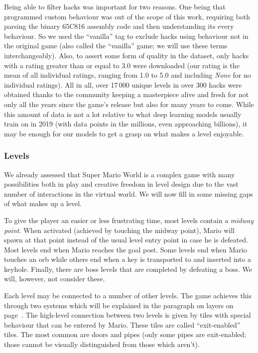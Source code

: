 Being able to filter hacks was important for two reasons. One being
that programmed custom behaviour was out of the scope of this work,
requiring both parsing the binary 65C816 assembly code and then
understanding its every behaviour. So we used the ``vanilla'' tag to
exclude hacks using behaviour not in the original game (also called
the ``vanilla'' game; we will use these terms interchangeably). Also,
to assert some form of quality in the dataset, only hacks with a
rating greater than or equal to 3.0 were downloaded (our rating is the
mean of all individual ratings, ranging from 1.0 to 5.0 and including
\emph{None} for no individual ratings). All in all, over 17\,000
unique levels in over 300 hacks were obtained thanks to the community
keeping a masterpiece alive and fresh for not only all the years since
the game's release but also for many years to come. While this amount
of data is not a lot relative to what deep learning models usually
train on in 2019 (with data points in the millions, even approaching
billions), it may be enough for our models to get a grasp on what
makes a level enjoyable.

\subsubsection{Levels}
\label{sec:levels}

We already assessed that Super Mario World is a complex game with many
possibilities both in play and creative freedom in level design due to
the vast number of interactions in the virtual world. We will now fill
in some missing gaps of what makes up a level.

To give the player an easier or less frustrating time, most levels
contain a \emph{midway point}. When activated (achieved by touching
the midway point), Mario will spawn at that point instead of the usual
level entry point in case he is defeated. Most levels end when Mario
reaches the goal post. Some levels end when Mario touches an orb while
others end when a key is transported to and inserted into a keyhole.
Finally, there are boss levels that are completed by defeating a boss.
We will, however, not consider these.

Each level may be connected to a number of other levels. The game
achieves this through two systems which will be explained in the
paragraph on layers on page~\pageref{par:layers}. The high-level
connection between two levels is given by tiles with special behaviour
that can be entered by Mario. These tiles are called ``exit-enabled''
tiles. The most common are doors and pipes (only some pipes are
exit-enabled; those cannot be visually distinguished from those which
aren't).

